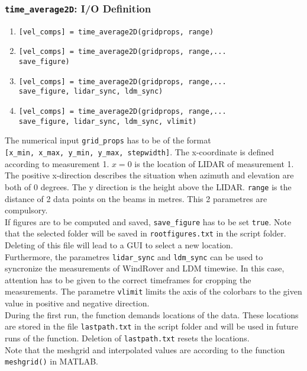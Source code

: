 \documentclass[
12pt,
a4paper,
twoside]
{article}
\begin{document}
\subsubsection{\texttt{time\_{}average2D}: I/O Definition}
\begin{enumerate}
\item \verb![vel_comps] = time_average2D(gridprops, range)!
\item \verb![vel_comps] = time_average2D(gridprops, range,...!\\
 \verb!save_figure)!
\item \verb![vel_comps] = time_average2D(gridprops, range,...!\\
 \verb!save_figure, lidar_sync, ldm_sync)!
\item \verb![vel_comps] = time_average2D(gridprops, range,...!\\
 \verb!save_figure, lidar_sync, ldm_sync, vlimit)!
\end{enumerate}
The numerical input \verb!grid_props! has to be of the format\\
\verb![x_min, x_max, y_min, y_max, stepwidth]!. The x-coordinate is defined according to measurement 1. $x=0$ is the location of LIDAR of measurement 1. The positive x-direction describes the situation when azimuth and elevation are both of 0 degrees. The y direction is the height above the LIDAR. \verb!range! is the distance of 2 data points on the beams in metres. This 2 parametres are compulsory.\\
If figures are to be computed and saved, \verb!save_figure! has to be set \verb!true!. Note that the selected folder will be saved in \verb!rootfigures.txt! in the script folder. Deleting of this file will lead to a GUI to select a new location.\\
Furthermore, the parametres \verb!lidar_sync! and \verb!ldm_sync! can be used to syncronize the measurements of WindRover and LDM timewise. In this case, attention has to be given to the correct timeframes for cropping the measurements. The parametre \verb!vlimit! limits the axis of the colorbars to the given value in positive and negative direction.\\
During the first run, the function demands locations of the data. These locations are stored in the file \verb!lastpath.txt! in the script folder and will be used in future runs of the function. Deletion of \verb!lastpath.txt! resets the locations.\\
Note that the meshgrid and interpolated values are according to the function \verb!meshgrid()! in MATLAB.\\
\end{document}
